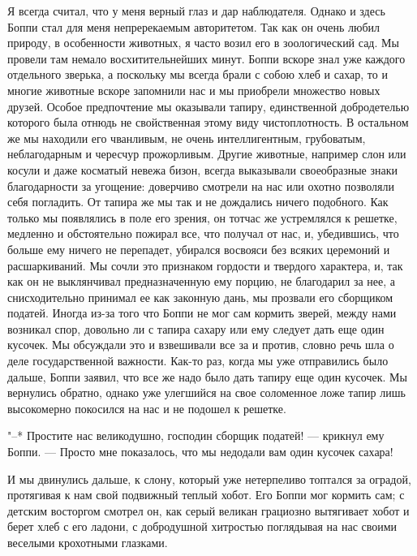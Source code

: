 Я всегда  считал, что  у меня  верный глаз  и дар  наблюдателя. Однако
и  здесь  Боппи  стал  для меня  непререкаемым  авторитетом.  Так  как
он  очень  любил  природу,  в  особенности  животных,  я  часто  возил
его  в  зоологический сад.  Мы  провели  там немало  восхитительнейших
минут. Боппи вскоре  знал уже каждого отдельного  зверька, а поскольку
мы  всегда  брали  с  собою  хлеб   и  сахар,  то  и  многие  животные
вскоре запомнили  нас и  мы приобрели  множество новых  друзей. Особое
предпочтение мы  оказывали тапиру, единственной  добродетелью которого
была отнюдь не свойственная этому  виду чистоплотность. В остальном же
мы  находили  его  чванливым,  не  очень  интеллигентным,  грубоватым,
неблагодарным  и  чересчур   прожорливым.  Другие  животные,  например
слон  или  косули и  даже  косматый  невежа бизон,  всегда  выказывали
своеобразные знаки  благодарности за  угощение: доверчиво  смотрели на
нас или  охотно позволяли  себя погладить.  От тапира же  мы так  и не
дождались  ничего  подобного. Как  только  мы  появлялись в  поле  его
зрения, он  тотчас же устремлялся  к решетке, медленно  и обстоятельно
пожирал все, что получал от нас,  и, убедившись, что больше ему ничего
не перепадет, убирался восвояси  без всяких церемоний и расшаркиваний.
Мы сочли  это признаком гордости и  твердого характера, и, так  как он
не  выклянчивал  предназначенную ему  порцию,  не  благодарил за  нее,
а  снисходительно  принимал ее  как  законную  дань, мы  прозвали  его
сборщиком  податей. Иногда  из-за того  что Боппи  не мог  сам кормить
зверей, между нами возникал спор, довольно  ли с тапира сахару или ему
следует дать еще один кусочек. Мы  обсуждали это и взвешивали все за и
против, словно речь  шла о деле государственной  важности. Как-то раз,
когда мы  уже отправились было дальше,  Боппи заявил, что все  же надо
было дать  тапиру еще один  кусочек. Мы вернулись обратно,  однако уже
улегшийся на свое соломенное ложе  тапир лишь высокомерно покосился на
нас и не подошел к решетке.

"--* Простите  нас великодушно, господин сборщик  податей! --- крикнул
ему Боппи. --- Просто мне показалось, что мы недодали вам один кусочек
сахара!

И мы  двинулись дальше, к  слону, который уже нетерпеливо  топтался за
оградой, протягивая к  нам свой подвижный теплый хобот.  Его Боппи мог
кормить  сам;  с  детским  восторгом смотрел  он,  как  серый  великан
грациозно вытягивает  хобот и берет  хлеб с его ладони,  с добродушной
хитростью поглядывая на нас своими веселыми крохотными глазками.

